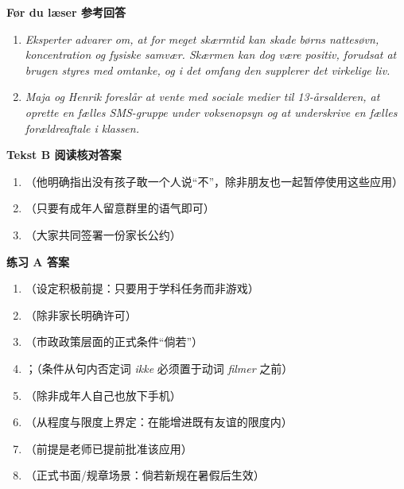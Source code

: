 \begin{answerbox}
\textbf{Før du læser 参考回答}
\begin{enumerate}
  \item \textit{Eksperter advarer om, at for meget skærmtid kan skade børns nattesøvn, koncentration og fysiske samvær. Skærmen kan dog være positiv, forudsat at brugen styres med omtanke, og i det omfang den supplerer det virkelige liv.}
  \item \textit{Maja og Henrik foreslår at vente med sociale medier til 13-årsalderen, at oprette en fælles SMS-gruppe under voksenopsyn og at underskrive en fælles forældreaftale i klassen.}
\end{enumerate}

\textbf{Tekst B 阅读核对答案}
\begin{enumerate}
  \item {}（他明确指出没有孩子敢一个人说“不”，除非朋友也一起暂停使用这些应用）
  \item {}（只要有成年人留意群里的语气即可）
  \item {}（大家共同签署一份家长公约）
\end{enumerate}

\textbf{练习 A 答案}
\begin{enumerate}
  \item {}（设定积极前提：只要用于学科任务而非游戏）
  \item {}（除非家长明确许可）
  \item {}（市政政策层面的正式条件“倘若”）
  \item {}；（条件从句内否定词 \textit{ikke} 必须置于动词 \textit{filmer} 之前）
  \item {}（除非成年人自己也放下手机）
  \item {}（从程度与限度上界定：在能增进既有友谊的限度内）
  \item {}（前提是老师已提前批准该应用）
  \item {}（正式书面/规章场景：倘若新规在暑假后生效）
\end{enumerate}


\end{answerbox}
